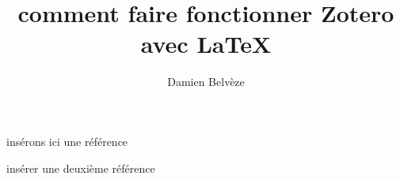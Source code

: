 \documentclass[12pt]{article}
\title{comment faire fonctionner Zotero avec LaTeX}
\author{Damien Belvèze}
\begin{document}
\maketitle

insérons ici une référence \cite{claveyMastodonRefugePour2023}


insérer une deuxième référence \cite{godefroidCommentCertifierCompte2024}

\printbibliography
\end{document}
